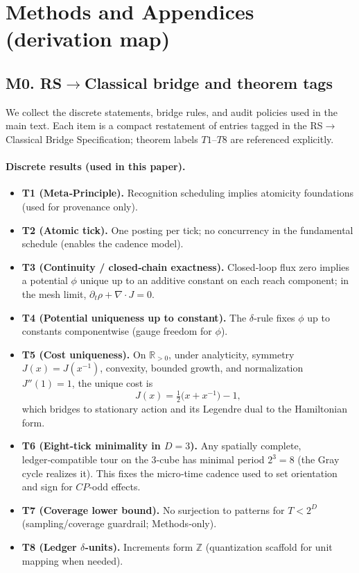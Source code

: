 \documentclass[11pt]{article}
\begin{document}
\section{Methods and Appendices (derivation map)}

\subsection*{M0. RS$\to$Classical bridge and theorem tags}
We collect the discrete statements, bridge rules, and audit policies used in the main text. Each item is a compact restatement of entries tagged in the RS$\to$Classical Bridge Specification; theorem labels \(T1\)–\(T8\) are referenced explicitly.

\paragraph{Discrete results (used in this paper).}
\begin{itemize}
  \item \textbf{T1 (Meta‑Principle).} Recognition scheduling implies atomicity foundations (used for provenance only).
  \item \textbf{T2 (Atomic tick).} One posting per tick; no concurrency in the fundamental schedule (enables the cadence model).
  \item \textbf{T3 (Continuity / closed‑chain exactness).} Closed‑loop flux zero implies a potential \(\phi\) unique up to an additive constant on each reach component; in the mesh limit, \(\partial_t\rho+\nabla\!\cdot J=0\).
  \item \textbf{T4 (Potential uniqueness up to constant).} The \(\delta\)‑rule fixes \(\phi\) up to constants componentwise (gauge freedom for \(\phi\)).
  \item \textbf{T5 (Cost uniqueness).} On \(\mathbb{R}_{>0}\), under analyticity, symmetry \(J(x)=J(x^{-1})\), convexity, bounded growth, and normalization \(J''(1)=1\), the unique cost is
        \[
        J(x)=\tfrac12\bigl(x+x^{-1}\bigr)-1,
        \]
        which bridges to stationary action and its Legendre dual to the Hamiltonian form.
  \item \textbf{T6 (Eight‑tick minimality in \(D=3\)).} Any spatially complete, ledger‑compatible tour on the 3‑cube has minimal period \(2^3=8\) (the Gray cycle realizes it). This fixes the micro‑time cadence used to set orientation and sign for \(CP\)‑odd effects.
  \item \textbf{T7 (Coverage lower bound).} No surjection to patterns for \(T<2^D\) (sampling/coverage guardrail; Methods‑only).
  \item \textbf{T8 (Ledger \(\delta\)‑units).} Increments form \(\mathbb{Z}\) (quantization scaffold for unit mapping when needed).
\end{itemize}
\end{document}
